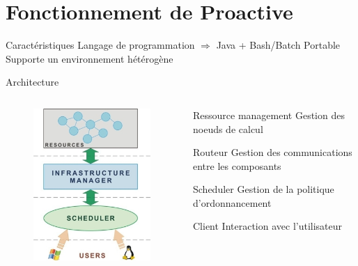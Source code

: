 \documentclass{beamer}
\begin{document}
\section[Fonctionnement]{Fonctionnement de Proactive}
\begin{frame}{Caractéristiques}
    Langage de programmation $\Longrightarrow$ Java + Bash/Batch
    Portable
    Supporte un environnement hétérogène%

\end{frame}
\begin{frame}{Architecture}
	\begin{columns}
	\begin{column}[l]{0.5\linewidth}
        \begin{figure}
            \centering
            \includegraphics[scale=0.4]{arch.png}
        \end{figure}
	\end{column}
	\begin{column}[r]{0.5\linewidth}
        \begin{alertblock}{Ressource management}
            Gestion des noeuds de calcul
        \end{alertblock}
        \begin{block}{Routeur}
             Gestion des communications entre les composants
        \end{block}
        \begin{exampleblock}{Scheduler}
             Gestion de la politique d'ordonnancement
        \end{exampleblock}
        \begin{alertblock}{Client}
            Interaction avec l'utilisateur
        \end{alertblock}
        
	\end{column}
	\end{columns}
\end{frame}
\end{document}
